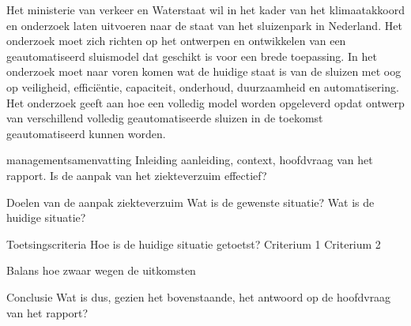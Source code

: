 
Het ministerie van verkeer en Waterstaat wil in het kader van het klimaatakkoord en onderzoek laten uitvoeren naar de staat van het sluizenpark in Nederland. Het onderzoek moet zich richten op het ontwerpen en ontwikkelen van een geautomatiseerd sluismodel dat geschikt is voor een brede toepassing. In het onderzoek moet naar voren komen wat de huidige staat is van de sluizen met oog op veiligheid, efficiëntie, capaciteit, onderhoud, duurzaamheid en automatisering. Het onderzoek geeft aan hoe een volledig model worden opgeleverd opdat ontwerp van verschillend volledig geautomatiseerde sluizen in de toekomst geautomatiseerd kunnen worden.  

managementsamenvatting
Inleiding
aanleiding, context, hoofdvraag van het rapport. Is de aanpak van het ziekteverzuim effectief?

Doelen van de aanpak ziekteverzuim
Wat is de gewenste situatie?
Wat is de huidige situatie?

Toetsingscriteria
Hoe is de huidige situatie getoetst?
Criterium 1
Criterium 2

Balans 
hoe zwaar wegen de uitkomsten

Conclusie
Wat is dus, gezien  het bovenstaande, het antwoord op de hoofdvraag van het rapport?
